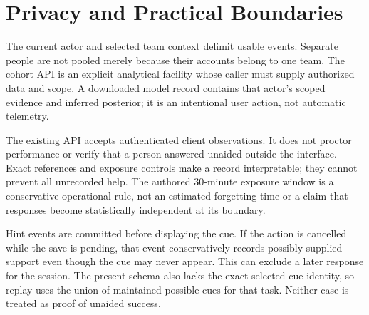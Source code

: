 \section{Privacy and Practical Boundaries}

The current actor and selected team context delimit usable events. Separate
people are not pooled merely because their accounts belong to one team.
The cohort API is an explicit analytical facility whose caller must supply
authorized data and scope. A downloaded model record contains that actor's
scoped evidence and inferred posterior; it is an intentional user action,
not automatic telemetry.

The existing API accepts authenticated client observations. It does not
proctor performance or verify that a person answered unaided outside the
interface. Exact references and exposure controls make a record interpretable;
they cannot prevent all unrecorded help. The authored 30-minute exposure
window is a conservative operational rule, not an estimated forgetting time
or a claim that responses become statistically independent at its boundary.

Hint events are committed before displaying the cue. If the action is
cancelled while the save is pending, that event conservatively records
possibly supplied support even though the cue may never appear. This can
exclude a later response for the session. The present schema also lacks
the exact selected cue identity, so replay uses the union of maintained
possible cues for that task. Neither case is treated as proof of unaided
success.
